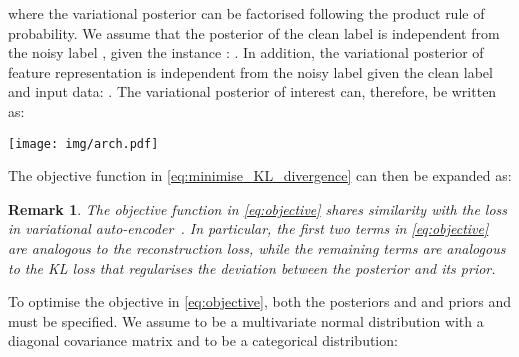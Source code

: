 \documentclass[10pt,twocolumn,letterpaper]{article}
\newtheorem{remark}{Remark}
\begin{document}
        where the variational posterior  can be factorised following the product rule of probability. We assume that the posterior of the clean label  is independent from the noisy label , given the instance : . In addition, the variational posterior of feature representation is independent from the noisy label given the clean label and input data: . The variational posterior of interest can, therefore, be written as:
        

        \begin{figure*}[ht!]
            \centering
            \texttt{[image: img/arch.pdf]}
            \caption{The proposed InstanceGM trains the \textit{Classifiers} to output clean labels for  instance-dependent noisy-label samples. We first warmup our two classifiers \textit{(Classifier-\{11,12\})} using the classification loss, and then with classification loss we train the GMM to separate clean and noisy samples with the semi-supervised model MixMatch~\cite{berthelot2019mixmatch} from the DivideMix~\cite{li2020dividemix} stage. Additionally, another set of encoders \textit{(Encoder-\{1,2\})} are used to generate the latent image features as depicted in the graphical model from~\cref{fig:graphical_model}. Furthermore, for image reconstruction, the decoders \textit{(Decoder-\{1,2\})} are used by utilizing the continuous Bernoulli loss, and another set of classifiers \textit{(Classifier-\{21,22\})} helps to identify the original noisy labels using the standard cross-entropy loss. 
}            \label{fig:architecture}
\end{figure*}
        
        The objective function in \eqref{eq:minimise_KL_divergence} can then be expanded as:
        
        
        \begin{remark}
            The objective function  in \eqref{eq:objective} shares similarity with the loss in variational auto-encoder~\cite{kingma2013auto}. In particular, the first two terms in \eqref{eq:objective} are analogous to the reconstruction loss, while the remaining terms are analogous to the KL loss that regularises the deviation between the posterior  and its prior.
        \end{remark}
        
        To optimise the objective in \eqref{eq:objective}, both the posteriors  and  and priors  and  must be specified. We assume  to be a multivariate normal distribution with a diagonal covariance matrix and  to be a categorical distribution:
        
\end{document}
